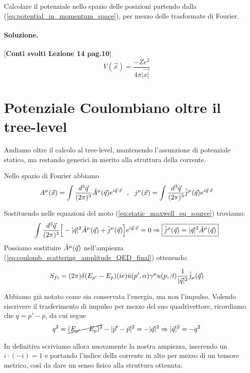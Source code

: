 \documentclass[../main.tex]{subfiles}
\begin{document}
\begin{exercise}
    Calcolare il potenziale nello spazio delle posizioni partendo dalla (\ref{eq:potential_in_momentum_space}), per mezzo delle trasformate di Fourier.

    \paragraph{Soluzione.} [\textbf{Conti svolti Lezione 14 pag.10}]
    \begin{equation}
        V(\Vec{x}) = \frac{-Ze^2}{4\pi|\Vec{x|}}
        \label{eq:coulomb_potential}
    \end{equation}
\end{exercise}

\section{Potenziale Coulombiano oltre il tree-level}

Andiamo oltre il calcolo al tree-level, mantenendo l'assunzione di potenziale statico, ma restando generici in merito alla struttura della corrente.

Nello spazio di Fourier abbiamo
\[
A^\mu(\Vec x) = \int\frac{d^3\Vec q}{(2\pi)^3}\Tilde{A}^\mu(\Vec{q})e^{i\Vec{q}\cdot\Vec{x}}~~,~~
j^\mu(\Vec x) = \int\frac{d^3\Vec q}{(2\pi)^3}\Tilde{j}^\mu(\Vec{q})e^{i\Vec{q}\cdot\Vec{x}}
\]

Sostituendo nelle equazioni del moto (\ref{eq:static_maxwell_eq_source}) troviamo:
\[
\int\frac{d^3\Vec q}{(2\pi)^3}\Big[-|\Vec q|^2\Tilde{A}^\mu(\Vec{q}) + \Tilde{j}^\mu(\Vec{q}) \Big]e^{i\Vec{q}\cdot\Vec{x}} = 0 \Rightarrow \boxed{\Tilde{j}^\mu(\Vec{q}) = |\Vec q|^2\Tilde{A}^\mu(\Vec{q})}
\]
Possiamo sostituire \(\Tilde{A}^\mu(\Vec{q})\) nell'ampiezza (\ref{eq:coulomb_scattering_amplitude_QED_final}) ottenendo:

\[
S_{fi}=(2\pi) \delta(E_{p'}-E_p) (ie)\bar u(p',\alpha) \gamma^\mu u( p,\beta)\frac{1}{|\Vec q|^2}\Tilde{j}_\mu(\Vec{q})
\]

Abbiamo già notato come sia conservata l'energia, ma non l'impulso. Volendo riscrivere il trasferimento di impulso per mezzo del suo quadrivettore, ricordiamo che \(q = p'-p\), da cui segue
\[
q^2 = \cancel{(E_{p'} - E_p)^2} - |\Vec{p}' -\Vec{p}|^2 = -|\Vec{q}|^2 \Rightarrow |\Vec{q}|^2 = -q^2
\]

In definitiva scriviamo allora nuovamente la nostra ampiezza, inserendo un $i\cdot(-i) = 1$ e portando l'indice della corrente in alto per mezzo di un tensore metrico, così da dare un senso fisico alla struttura ottenuta:
\end{document}
